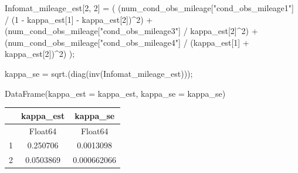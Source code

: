 \documentclass[
  letterpaper,
  DIV=11,
  numbers=noendperiod]{scrreprt}
\newenvironment{Shaded}{\begin{snugshade}}{\end{snugshade}}
\newcommand{\FloatTok}[1]{\textcolor[rgb]{0.68,0.00,0.00}{#1}}
\newcommand{\FunctionTok}[1]{\textcolor[rgb]{0.28,0.35,0.67}{#1}}
\newcommand{\NormalTok}[1]{\textcolor[rgb]{0.00,0.23,0.31}{#1}}
\newcommand{\OperatorTok}[1]{\textcolor[rgb]{0.37,0.37,0.37}{#1}}
\newcommand{\StringTok}[1]{\textcolor[rgb]{0.13,0.47,0.30}{#1}}
\begin{document}
\begin{Shaded}
\begin{Highlighting}[]
\NormalTok{Infomat\_mileage\_est[}\FloatTok{2}\NormalTok{, }\FloatTok{2}\NormalTok{] }\OperatorTok{=}\NormalTok{ (}
\NormalTok{    (num\_cond\_obs\_mileage[}\StringTok{"cond\_obs\_mileage1"}\NormalTok{] }\OperatorTok{/}\NormalTok{ (}\FloatTok{1} \OperatorTok{{-}}\NormalTok{ kappa\_est[}\FloatTok{1}\NormalTok{] }\OperatorTok{{-}}\NormalTok{ kappa\_est[}\FloatTok{2}\NormalTok{])}\OperatorTok{\^{}}\FloatTok{2}\NormalTok{) }\OperatorTok{+}
\NormalTok{    (num\_cond\_obs\_mileage[}\StringTok{"cond\_obs\_mileage3"}\NormalTok{] }\OperatorTok{/}\NormalTok{ kappa\_est[}\FloatTok{2}\NormalTok{]}\OperatorTok{\^{}}\FloatTok{2}\NormalTok{) }\OperatorTok{+}
\NormalTok{    (num\_cond\_obs\_mileage[}\StringTok{"cond\_obs\_mileage4"}\NormalTok{] }\OperatorTok{/}\NormalTok{ (kappa\_est[}\FloatTok{1}\NormalTok{] }\OperatorTok{+}\NormalTok{ kappa\_est[}\FloatTok{2}\NormalTok{])}\OperatorTok{\^{}}\FloatTok{2}\NormalTok{)}
\NormalTok{);}

\NormalTok{kappa\_se }\OperatorTok{=} \FunctionTok{sqrt}\NormalTok{.(}\FunctionTok{diag}\NormalTok{(}\FunctionTok{inv}\NormalTok{(Infomat\_mileage\_est)));}
\end{Highlighting}
\end{Shaded}

\begin{Shaded}
\begin{Highlighting}[]
\FunctionTok{DataFrame}\NormalTok{(kappa\_est }\OperatorTok{=}\NormalTok{ kappa\_est, kappa\_se }\OperatorTok{=}\NormalTok{ kappa\_se)}
\end{Highlighting}
\end{Shaded}

\begin{tabular}{r|cc}
    & kappa\_est & kappa\_se\\
    \hline
    & Float64 & Float64\\
    \hline
    1 & 0.250706 & 0.0013098 \\
    2 & 0.0503869 & 0.000662066 \\
\end{tabular}
\end{document}
